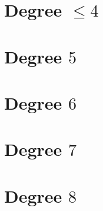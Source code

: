 \documentclass{amsart}
\numberwithin{equation}{section}
\theoremstyle{definition}
\theoremstyle{remark}
\begin{document}
\section{Degree $\leq 4$}{
}
\section{Degree $5$}{
}
\section{Degree $6$}{
}
\section{Degree $7$}{
}
\section{Degree $8$}{
}

\nocite{*}










\end{document}
